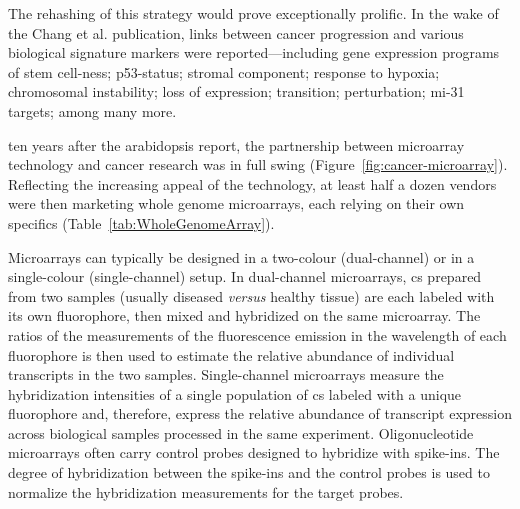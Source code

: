 The rehashing of this strategy would prove exceptionally prolific.  In the wake
of the Chang et al. publication, links between cancer progression and various
biological signature markers were reported---including gene expression programs
of stem
\mbox{cell-ness};\cite{glinsky_microarray_2005,ben-porath_embryonic_2008}
p53-status;\cite{miller_expression_2005} stromal
component;\cite{west_determination_2005} response to
hypoxia;\cite{chi_gene_2006} chromosomal
instability;\cite{carter_signature_2006,buffa_large_2010} loss of
\emph{} expression;\cite{saal_poor_2007} 
transition;\cite{welm_macrophage-stimulating_2007,taube_core_2010}
\emph{} perturbation;\cite{hallstrom_e2f1-dependent_2008}
mi-31 targets;\cite{valastyan_tumor_2011} among many more.

\medskip

 ten years after the arabidopsis report, the partnership
between microarray technology and cancer research was in full swing
(Figure~\ref{fig:cancer-microarray}).  Reflecting the increasing appeal of the
technology, at least half a dozen vendors were then marketing whole genome
microarrays, each relying on their own specifics
(Table~\ref{tab:WholeGenomeArray}).

Microarrays can typically be designed in a \mbox{two-colour}
(\mbox{dual-channel}) or in a \mbox{single-colour} (\mbox{single-channel})
setup.  In \mbox{dual-channel} microarrays, cs prepared from two
samples (usually diseased \emph{versus} healthy tissue) are each labeled with
its own fluorophore, then mixed and hybridized on the same microarray.  The
ratios of the measurements of the fluorescence emission in the wavelength of
each fluorophore is then used to estimate the relative abundance of individual
transcripts in the two samples.  \mbox{Single-channel} microarrays measure the
hybridization intensities of a single population of cs labeled
with a unique fluorophore and, therefore, express the relative abundance of
transcript expression across biological samples processed in the same
experiment.  Oligonucleotide microarrays often carry control probes designed to
hybridize with  \mbox{spike-ins}.  The degree of hybridization
between the \mbox{spike-ins} and the control probes is used to normalize the
hybridization measurements for the target probes.

